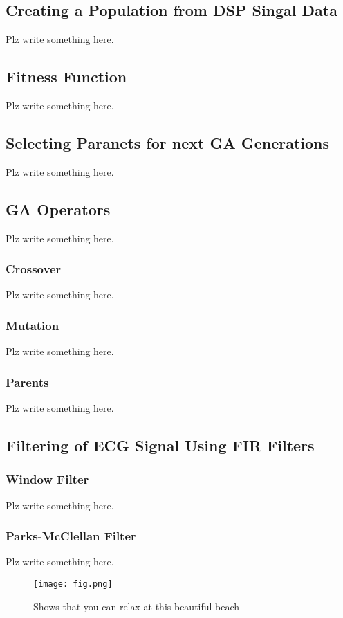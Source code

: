 \documentclass[a4paper, 11pt]{article}
\begin{document}
    \subsection{Creating a Population from DSP Singal Data}\label{sec:meth_sub1}
    Plz write something here.
    \subsection{Fitness Function}\label{sec:meth_sub2}
    Plz write something here.
    \subsection{Selecting Paranets for next GA Generations}\label{sec:meth_sub3}
    Plz write something here.
    \subsection{GA Operators}\label{sec:meth_sub4}
    Plz write something here.
        \subsubsection{Crossover}
            Plz write something here.
        \subsubsection{Mutation}
            Plz write something here.
        \subsubsection{Parents}
            Plz write something here.
    \subsection{Filtering of ECG Signal Using FIR Filters}\label{sec:meth_sub5}
        \subsubsection{Window Filter}
            Plz write something here.
        \subsubsection{Parks-McClellan Filter}
            Plz write something here.
    
    \begin{figure}[h]
        \centering
        \graphicspath{{./wiki/}}
        \texttt{[image: fig.png]}
        \caption{Shows that you can relax at this beautiful beach}
        \label{Fig:my_label}
    \end{figure}
\end{document}

